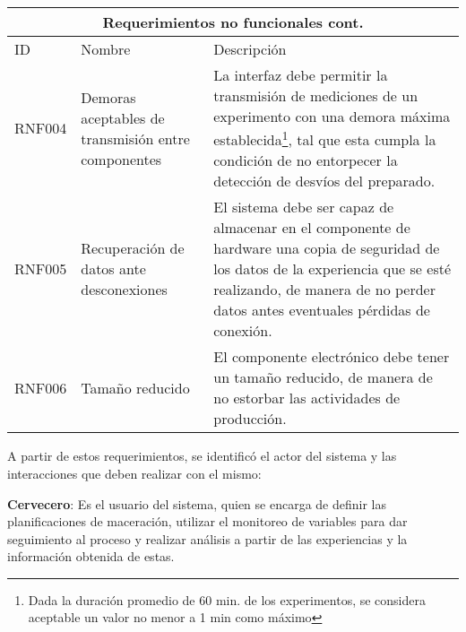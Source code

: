     \begin{center}
    \begin{tabularx}{\textwidth}{| X | X | X |}
    \hline
    \multicolumn{3}{|c|}{\textbf{Requerimientos no funcionales cont.}} \\
    \hline
    ID & Nombre & Descripción \\
    \hline
    \hline          
         RNF004 & Demoras aceptables de transmisión entre componentes & La interfaz debe permitir la transmisión de mediciones de un experimento con una demora máxima establecida\footnote{Dada la duración promedio de 60 min. de los experimentos, se considera aceptable un valor no menor a 1 min como máximo}, tal que esta cumpla la condición de no entorpecer la detección de desvíos del preparado.
         \\ \hline
        RNF005 & Recuperación de datos ante desconexiones & El sistema debe ser capaz de almacenar en el componente de hardware una copia de seguridad de los datos de la experiencia que se esté realizando, de manera de no perder datos antes eventuales pérdidas de conexión.
        \\ \hline
        RNF006 & Tamaño reducido & El componente electrónico debe tener un tamaño reducido, de manera de no estorbar las actividades de producción.
         \\\hline
    \end{tabularx}
    \label{ReqNoFuncionales_Parte2}
    \end{center}
    
    
    \par
    A partir de estos requerimientos, se identificó el actor del sistema y las
    interacciones que deben realizar con el mismo:
    \par
    \textbf{Cervecero}: Es el usuario del sistema, quien se encarga de definir las planificaciones de maceración, utilizar el monitoreo de variables para dar seguimiento al proceso y realizar análisis a partir de las experiencias y la información obtenida de estas.
 
 
    
